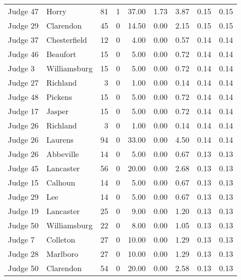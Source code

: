 \begin{tabular}{llrrrrrrr}
Judge 47 &        Horry &    81 &      1 & 37.00 &       1.73 &      3.87 &         0.15 &      0.15 \\
Judge 29 &    Clarendon &    45 &      0 & 14.50 &       0.00 &      2.15 &         0.15 &      0.15 \\
Judge 37 & Chesterfield &    12 &      0 &  4.00 &       0.00 &      0.57 &         0.14 &      0.14 \\
Judge 46 &     Beaufort &    15 &      0 &  5.00 &       0.00 &      0.72 &         0.14 &      0.14 \\
 Judge 3 & Williamsburg &    15 &      0 &  5.00 &       0.00 &      0.72 &         0.14 &      0.14 \\
Judge 27 &     Richland &     3 &      0 &  1.00 &       0.00 &      0.14 &         0.14 &      0.14 \\
Judge 48 &      Pickens &    15 &      0 &  5.00 &       0.00 &      0.72 &         0.14 &      0.14 \\
Judge 17 &       Jasper &    15 &      0 &  5.00 &       0.00 &      0.72 &         0.14 &      0.14 \\
Judge 26 &     Richland &     3 &      0 &  1.00 &       0.00 &      0.14 &         0.14 &      0.14 \\
Judge 26 &      Laurens &    94 &      0 & 33.00 &       0.00 &      4.50 &         0.14 &      0.14 \\
Judge 26 &    Abbeville &    14 &      0 &  5.00 &       0.00 &      0.67 &         0.13 &      0.13 \\
Judge 45 &    Lancaster &    56 &      0 & 20.00 &       0.00 &      2.68 &         0.13 &      0.13 \\
Judge 15 &      Calhoun &    14 &      0 &  5.00 &       0.00 &      0.67 &         0.13 &      0.13 \\
Judge 29 &          Lee &    14 &      0 &  5.00 &       0.00 &      0.67 &         0.13 &      0.13 \\
Judge 19 &    Lancaster &    25 &      0 &  9.00 &       0.00 &      1.20 &         0.13 &      0.13 \\
Judge 50 & Williamsburg &    22 &      0 &  8.00 &       0.00 &      1.05 &         0.13 &      0.13 \\
 Judge 7 &     Colleton &    27 &      0 & 10.00 &       0.00 &      1.29 &         0.13 &      0.13 \\
Judge 28 &     Marlboro &    27 &      0 & 10.00 &       0.00 &      1.29 &         0.13 &      0.13 \\
Judge 50 &    Clarendon &    54 &      0 & 20.00 &       0.00 &      2.58 &         0.13 &      0.13 \\

\end{tabular}

